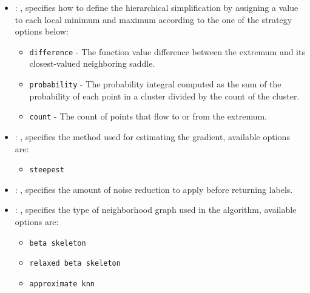 \begin{itemize}
    \item {}: ,
      specifies how                                                  to define the hierarchical
      simplification by assigning a value to each local
      minimum and maximum according to the one of the strategy options below:
      \begin{itemize}                                                    \item \texttt{difference} -
      The function value difference between the
      extremum and its closest-valued neighboring saddle.
      \item \texttt{probability} - The probability integral computed as the
      sum of the probability of each point in a cluster divided by the count of
      the cluster.                                                    \item \texttt{count} - The
      count of points that flow to or from the
      extremum.                                                  \end{itemize}

    \item {}: ,
      specifies the                                                  method used for estimating the
      gradient, available options are:
      \begin{itemize}                                                    \item \texttt{steepest}
      \end{itemize}

    \item {}: ,
      specifies the                                                  amount of noise reduction to
      apply before returning labels.

    \item {}: ,
      specifies the type                                                  of neighborhood graph used
      in the algorithm, available options are:
      \begin{itemize}                                                    \item \texttt{beta
      skeleton}                                                    \item \texttt{relaxed beta
      skeleton}                                                    \item \texttt{approximate knn}
      \end{itemize}


\end{itemize}
